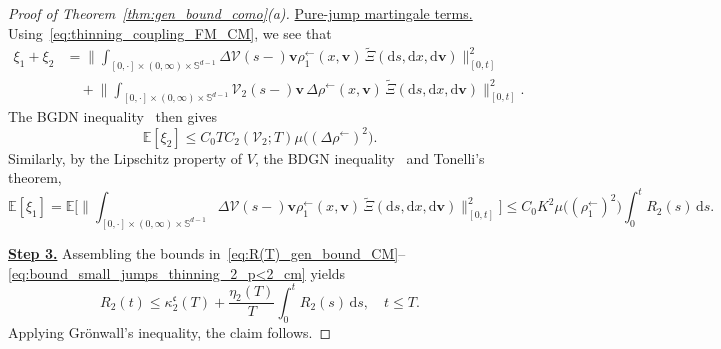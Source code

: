\documentclass[en,oneside,bbfont,article]{amsart}
\theoremstyle{remark}
\theoremstyle{definition}
\theoremstyle{definition}
\newcommand{\V}{\bm{\mathcal{V}}}
\newcommand\Sp{\mathbb{S}}
\newcommand\E{\mathds{E}}
\newcommand\1{\mathds{1}}
\newcommand\la{\leftarrow}
\renewcommand\le{\leqslant}
\newcommand{\D}{\mathrm{d}}
\newcommand{\wt}[1]{\widetilde{#1}}
\newcommand{\mfc}{{\mathfrak{c}}}
\begin{document}
\begin{proof}[Proof of Theorem~\ref{thm:gen_bound_como}(a)]
{\underline{Pure-jump martingale terms.}} 
Using~\eqref{eq:thinning_coupling_FM_CM}, we see that
\begin{align*}
\xi_{1}+\xi_{2}
&= \bigg\|\int_{[0,\cdot]\times (0,\infty)\times \Sp^{d-1}} \Delta\V(s-)\bm{v}\rho_{1}^{\la}(x,\bm{v}) \,\wt \Xi(\D s, \D x, \D \bm{v}) \bigg\|_{[0,t]}^2\\
&\quad +
\bigg\|\int_{[0,\cdot]\times (0,\infty)\times \Sp^{d-1}} \V_2(s-)\bm{v} \,\Delta\rho^{\la}(x,\bm{v})\,\wt\Xi(\D s, \D x, \D \bm{v})\bigg\|_{[0,t]}^2 .
\end{align*} 
The BGDN inequality~\cite[Thm~1(b)]{MR394861} then gives
\begin{equation}\label{eq_Xi_2_cm}
\E[\xi_2]
\le C_0 TC_2(\V_2;T)\mu\big((\Delta\rho^{\la})^2\big).
\end{equation}
Similarly, by the Lipschitz property of $V$, the BDGN inequality~\cite[Thm~1(b)]{MR394861} and Tonelli's theorem, 
\begin{equation}
\label{eq:bound_small_jumps_thinning_2_p<2_cm}
\E[\xi_{1}]
=\E\Bigg[\bigg\|\int_{[0,\cdot]\times (0,\infty)\times \Sp^{d-1}} \!\!\!\!\!\!\Delta\V(s-)\bm{v}\rho_{1}^{\la}(x,\bm{v})\,\wt \Xi(\D s, \D x, \D \bm{v}) \bigg\|_{[0,t]}^2 \Bigg]
\le C_0 K^2 \mu\big((\rho_1^\la)^2\big)\int_0^t \! R_2(s)\,\D s.
\end{equation}

\underline{\textbf{Step 3.}} Assembling the bounds in~\eqref{eq:R(T)_gen_bound_CM}--\eqref{eq:bound_small_jumps_thinning_2_p<2_cm} yields
\[
R_2(t)
\le \kappa^\mfc_2(T) + \frac{\eta_2(T)}{T}\int_0^t R_2(s)\,\D s,
\quad t\le T.
\]
Applying Gr\"onwall's inequality, the claim follows.
\end{proof}
\end{document}
